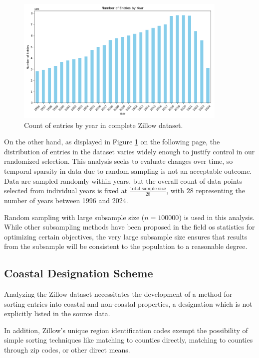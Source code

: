 \documentclass[12pt]{article}
\begin{document}
\begin{figure}[h]
    \centering
    \includegraphics[width=0.9\textwidth]{figures/annual_distribution_of_data.png}
    \caption{Count of entries by year in complete Zillow dataset.}
    \label{fig:annual_distribution_of_entries}
\end{figure}

On the other hand, as displayed in Figure \ref{fig:annual_distribution_of_entries} on the following page, the distribution of entries in the dataset varies widely enough to justify control in our randomized selection. This analysis seeks to evaluate changes over time, so temporal sparsity in data due to random sampling is not an acceptable outcome. Data are sampled randomly within years, but the overall count of data points selected from individual years is fixed at $\frac{\text{total sample size}}{28}$, with $28$ representing the number of years between 1996 and 2024.

Random sampling with large subsample size ($n = 100000$) is used in this analysis. While other subsampling methods have been proposed in the field os statistics for optimizing certain objectives, the very large subsample size ensures that results from the subsample will be consistent to the population to a reasonable degree. 

\subsection{Coastal Designation Scheme}

Analyzing the Zillow dataset necessitates the development of a method for sorting entries into coastal and non-coastal properties, a designation which is not explicitly listed in the source data. 

In addition, Zillow's unique region identification codes exempt the possibility of simple sorting techniques like matching to counties directly, matching to counties through zip codes, or other direct means.
\end{document}

